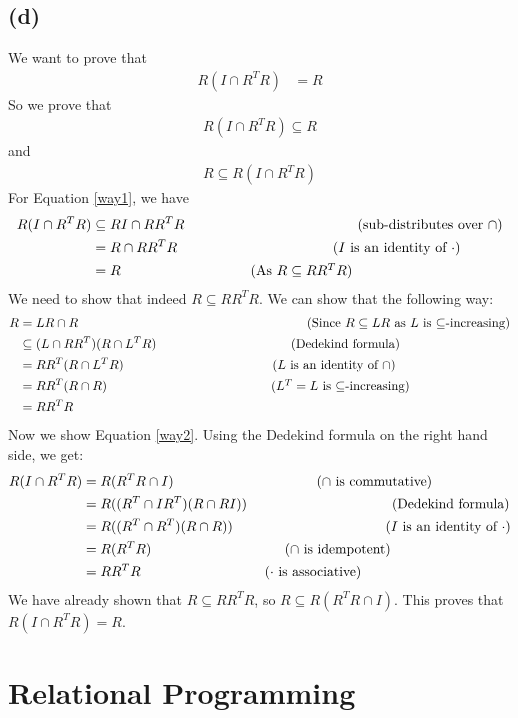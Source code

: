 \documentclass[a4paper, fleqn]{article}
\newcommand{\comment}[1]{%
  \text{\phantom{(#1)}} \tag{#1}}
\begin{document}
\subsection{(d)}
We want to prove that
\begin{align*}
  R(I\cap R^TR)&=R
\end{align*}
So we prove that
\begin{align}\label{way1}
  R(I\cap R^TR)\subseteq R
\end{align}
and
\begin{align}\label{way2}
  R\subseteq R(I\cap R^TR)
\end{align}
For Equation \ref{way1}, we have
\begin{align*}
  R(I\cap R^TR) &\subseteq RI\cap RR^TR \comment{sub-distributes over $\cap$} \\
                &=R\cap RR^TR  \comment{$I$ is an identity of $\cdot$}\\
                &=R \comment{As $R\subseteq RR^TR$}
\end{align*}
We need to show that indeed $R\subseteq RR^TR$. We can show that the following way:
\begin{align*}
  R &= LR\cap R \comment{Since $R\subseteq LR$ as $L$ is $\subseteq$-increasing} \\
    &\subseteq (L\cap RR^T)(R\cap L^TR) \comment{Dedekind formula} \\
    &= RR^T(R\cap L^TR) \comment{$L$ is an identity of $\cap$} \\
    &= RR^T(R\cap R) \comment{$L^T=L$ is $\subseteq$-increasing} \\
    &= RR^TR
\end{align*}
Now we show Equation \ref{way2}. Using the Dedekind formula on the right hand side, we get:
\begin{align*}
  R(I\cap R^TR) &= R(R^TR\cap I) \comment{$\cap$ is commutative} \\
                &= R((R^T\cap IR^T)(R\cap RI)) \comment{Dedekind formula}\\
                &= R((R^T\cap R^T)(R\cap R)) \comment {$I$ is an identity of $\cdot$} \\
                &= R(R^TR) \comment{$\cap$ is idempotent} \\
                &= RR^TR \comment{$\cdot$ is associative}
\end{align*}
We have already shown that $R\subseteq RR^TR$, so $R\subseteq R(R^TR\cap I)$. This proves
that $R(I\cap R^TR)=R$.

\section{Relational Programming}
\end{document}
